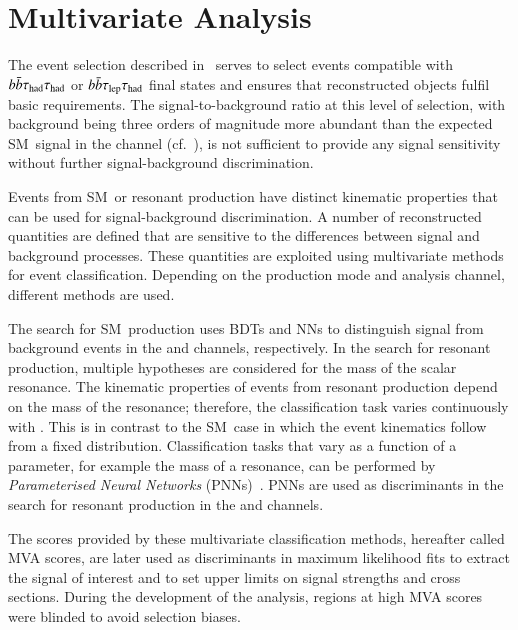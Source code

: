 \section{Multivariate Analysis}%
\label{sec:multivariate_analysis}

The event selection described in~ serves
to select events compatible with $b\bar{b}\tau_{\text{had}}\tau_{\text{had}}$ or $b\bar{b}\tau_{\text{lep}}\tau_{\text{had}}$ final states
and ensures that reconstructed objects fulfil basic requirements. The
signal-to-background ratio at this level of selection, with background being
three orders of magnitude more abundant than the expected SM~\HH signal in the
\hadhad channel (cf.~), is not sufficient to
provide any signal sensitivity without further signal-background discrimination.

Events from SM~\HH or resonant \HH production have distinct kinematic properties
that can be used for signal-background discrimination. A number of reconstructed
quantities are defined that are sensitive to the differences between signal and
background processes. These quantities are exploited using multivariate methods
for event classification. Depending on the \HH production mode and analysis
channel, different methods are used.

The search for SM~\HH production uses BDTs and NNs to distinguish signal from
background events in the \hadhad and \lephad channels, respectively. In the
search for resonant \HH production, multiple hypotheses are considered for the
mass of the scalar resonance. The kinematic properties of events from resonant
\HH production depend on the mass of the resonance; therefore, the
classification task varies continuously with \mX. This is in contrast to the
SM~\HH case in which the event kinematics follow from a fixed
distribution. Classification tasks that vary as a function of a parameter, for
example the mass of a resonance, can be performed by \emph{Parameterised Neural
  Networks} (PNNs)~\cite{Baldi:2016fzo}. PNNs are used as discriminants in the
search for resonant \HH production in the \hadhad and \lephad channels.

The scores provided by these multivariate classification methods, hereafter
called MVA scores, are later used as discriminants in maximum likelihood fits to
extract the signal of interest and to set upper limits on signal strengths and
cross sections.
During the development of the analysis, regions at high MVA scores were blinded
to avoid selection biases.

